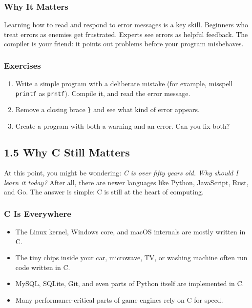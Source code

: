 \documentclass[
  letterpaper,
  DIV=11,
  numbers=noendperiod]{scrreprt}
\providecommand{\tightlist}{%
  \setlength{\itemsep}{0pt}\setlength{\parskip}{0pt}}
\begin{document}
\subsubsection{Why It Matters}\label{why-it-matters-3}

Learning how to read and respond to error messages is a key skill.
Beginners who treat errors as enemies get frustrated. Experts see errors
as helpful feedback. The compiler is your friend: it points out problems
before your program misbehaves.

\subsubsection{Exercises}\label{exercises-3}

\begin{enumerate}
\def\labelenumi{\arabic{enumi}.}
\tightlist
\item
  Write a simple program with a deliberate mistake (for example,
  misspell \texttt{printf} as \texttt{prntf}). Compile it, and read the
  error message.
\item
  Remove a closing brace \texttt{\}} and see what kind of error appears.
\item
  Create a program with both a warning and an error. Can you fix both?
\end{enumerate}

\subsection{1.5 Why C Still Matters}\label{why-c-still-matters}

At this point, you might be wondering: \emph{C is over fifty years old.
Why should I learn it today?} After all, there are newer languages like
Python, JavaScript, Rust, and Go. The answer is simple: C is still at
the heart of computing.

\subsubsection{C Is Everywhere}\label{c-is-everywhere}

\begin{itemize}
\tightlist
\item
  The Linux kernel, Windows core, and macOS internals are mostly written
  in C.
\item
  The tiny chips inside your car, microwave, TV, or washing machine
  often run code written in C.
\item
  MySQL, SQLite, Git, and even parts of Python itself are implemented in
  C.
\item
  Many performance-critical parts of game engines rely on C for speed.
\end{itemize}
\end{document}
